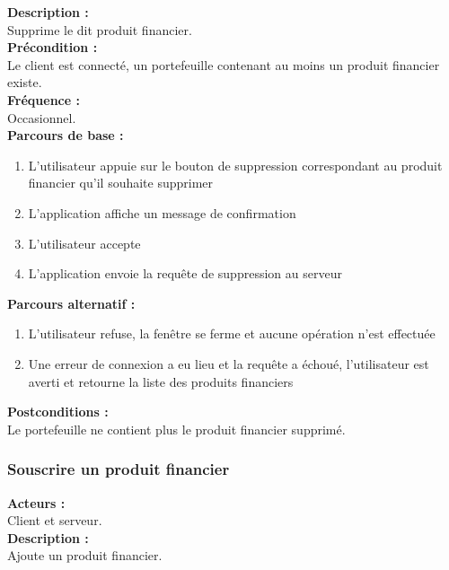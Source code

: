 \documentclass[../rapport.tex]{subfiles}
\begin{document}
\textbf{Description :} \\
Supprime le dit produit financier. \\

\textbf{Précondition :} \\
Le client est connecté, un portefeuille contenant au moins un produit financier existe. \\

\textbf{Fréquence :} \\
Occasionnel. \\

\textbf{Parcours de base :} \\
\begin{enumerate}
    \item L’utilisateur appuie sur le bouton de suppression correspondant au produit financier qu’il souhaite supprimer
    \item L’application affiche un message de confirmation
    \item L’utilisateur accepte
    \item L’application envoie la requête de suppression au serveur
\end{enumerate}
\bigskip

\textbf{Parcours alternatif :}
\begin{enumerate}
    \item L'utilisateur refuse, la fenêtre se ferme et aucune opération n'est effectuée
    \item Une erreur de connexion a eu lieu et la requête a échoué, l'utilisateur est averti et retourne la liste des produits financiers
\end{enumerate}

\textbf{Postconditions :} \\
Le portefeuille ne contient plus le produit financier supprimé. \\



\subsubsection{Souscrire un produit financier}

\textbf{Acteurs :} \\
Client et serveur. \\

\textbf{Description :} \\
Ajoute un produit financier. \\
\end{document}
